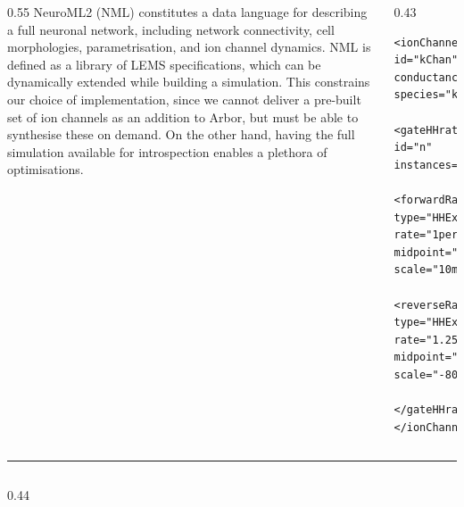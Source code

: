 \documentclass{beamer}
\begin{document}
\begin{frame}[t, fragile]
\begin{columns}
\begin{column}{0.55\textwidth}
      NeuroML2 (NML) constitutes a data language for describing a full neuronal
      network, including network connectivity, cell morphologies,
      parametrisation, and ion channel dynamics. NML is defined as a library of
      LEMS specifications, which can be dynamically extended while building a
      simulation. This constrains our choice of implementation, since we cannot
      deliver a pre-built set of ion channels as an addition to Arbor, but must
      be able to synthesise these on demand. On the other hand, having the full
      simulation available for introspection enables a plethora of
      optimisations.
    \end{column}
    \begin{column}{0.43\textwidth}
\begin{verbatim}
<ionChannelHH id="kChan" conductance="10pS" species="k">
  <gateHHrates id="n" instances="4">
    <forwardRate type="HHExpLinearRate" rate="1per_ms" midpoint="-55mV" scale="10mV"/>
    <reverseRate type="HHExpRate" rate="1.25per_ms" midpoint="-65mV" scale="-80mV"/>
  </gateHHrates>
</ionChannelHH>
\end{verbatim}
    \end{column}
  \end{columns}
  \vspace*{1ex}
  \textcolor{arbred}{\rule{\textwidth}{0.5ex}}
  \vspace*{-1ex}
  \begin{columns}
    \begin{column}{0.44\textwidth}
\end{column}
\end{columns}
\end{frame}
\end{document}
